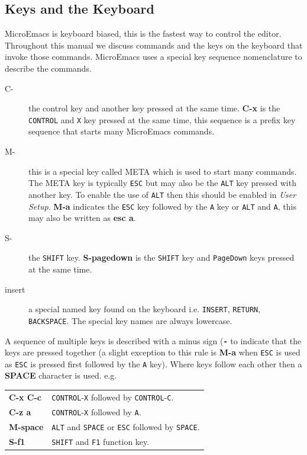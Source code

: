 \documentclass[11pt,a4paper,pdftex]{article}
\begin{document}
\subsection{Keys and the Keyboard}

  MicroEmacs is keyboard biased, this is the fastest way to control the
  editor. Throughout this manual we discuss commands and the keys on the
  keyboard that invoke those commands. MicroEmacs uses a special key sequence
  nomenclature to describe the commands.

  \begin{description}

    \item[C-] the control key and another key pressed at the same time.
    \textbf{C-x} is the \texttt{CONTROL} and \texttt{X} key pressed at the
    same time, this sequence is a prefix key sequence that starts many
    MicroEmacs commands.

    \item[M-] this is a special key called META which is used to start many
    commands. The META key is typically \texttt{ESC} but may also be the
    \texttt{ALT} key pressed with another key. To enable the use of
    \texttt{ALT} then this should be enabled in \textit{User Setup}.
    \textbf{M-a} indicates the \texttt{ESC} key followed by the \texttt{A} key
    or \texttt{ALT} and \texttt{A}, this may also be written as \textbf{esc
    a}.

    \item[S-] the \texttt{SHIFT} key. \textbf{S-pagedown} is the
    \texttt{SHIFT} key and \texttt{PageDown} keys pressed at the same time.

    \item[insert] a special named key found on the keyboard i.e.
    \texttt{INSERT}, \texttt{RETURN}, \texttt{BACKSPACE}. The special key
    names are always lowercase.

  \end{description}

  A sequence of multiple keys is described with a minus sign
  (\textbf{\texttt{-}} to indicate that the keys are pressed together (a
  slight exception to this rule is \textbf{M-a} when \texttt{ESC} is used as
  \texttt{ESC} is pressed first followed by the \texttt{A} key). Where keys
  follow each other then a \textbf{SPACE} character is used. e.g.

  \begin{longtable}{l@{\ --\ }l}
    \endhead
    \endfoot
    \endlastfoot
    \textbf{C-x C-c} & \texttt{CONTROL}-\texttt{X} followed by
                       \texttt{CONTROL}-\texttt{C}.\\

    \textbf{C-z a} & \texttt{CONTROL}-\texttt{X} followed by \texttt{A}.\\
    \textbf{M-space} & \texttt{ALT} and \texttt{SPACE} or \texttt{ESC} followed
                       by \texttt{SPACE}.\\
    \textbf{S-f1} & \texttt{SHIFT} and \texttt{F1} function key.\\
  \end{longtable}
\end{document}
